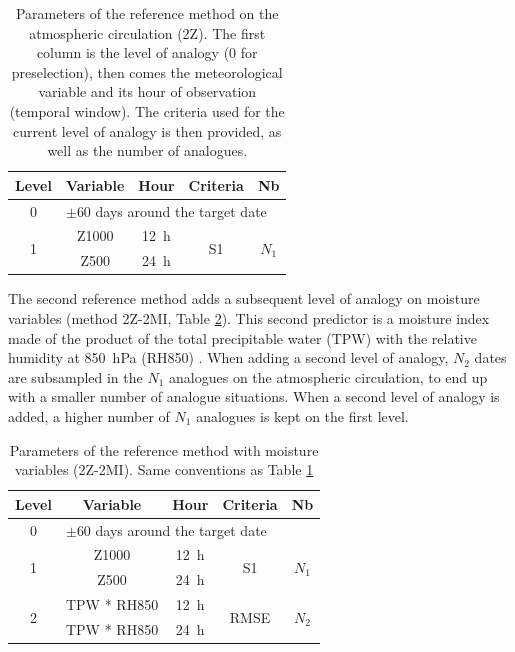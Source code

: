 \documentclass[hess]{copernicus}
\begin{document}
\begin{table}[htb]
	\caption{Parameters of the reference method on the atmospheric circulation (2Z). The first column is the level of analogy (0 for preselection), then comes the meteorological variable and its hour of observation (temporal window). The criteria used for the current level of analogy is then provided, as well as the number of analogues.}
	\footnotesize
	\begin{center}
		\begin{tabular}{ccccc}
			\hline
			Level & Variable & Hour & Criteria & Nb \\ 
			\hline 
			0 & \multicolumn{4}{l}{$\pm 60$ days around the target date} \\
			\hline 
			\multirow{2}{*}{1} & Z1000 & 12~h & \multirow{2}{*}{S1} & \multirow{2}{*}{$N_{1}$} \\
			& Z500 & 24~h & & \\ 
			\hline 
		\end{tabular} 
	\end{center}
	\label{table:method_2Z}
\end{table}

The second reference method adds a subsequent level of analogy on moisture variables (method 2Z-2MI, Table \ref{table:method_2Z-2MI}). This second predictor is a moisture index made of the product of the total precipitable water (TPW) with the relative humidity at 850~hPa (RH850) \citep{Bontron2004}. When adding a second level of analogy, $N_{2}$ dates are subsampled in the $N_{1}$ analogues on the atmospheric circulation, to end up with a smaller number of analogue situations. When a second level of analogy is added, a higher number of $N_{1}$ analogues is kept on the first level.

\begin{table}[htb]
	\caption{Parameters of the reference method with moisture variables (2Z-2MI). Same conventions as Table \ref{table:method_2Z}}
	\footnotesize
	\begin{center}
		\begin{tabular}{ccccc}
			\hline 
			Level & Variable & Hour & Criteria & Nb \\ 
			\hline 
			0 & \multicolumn{4}{l}{$\pm 60$ days around the target date} \\
			\hline 
			\multirow{2}{*}{1} & Z1000 & 12~h & \multirow{2}{*}{S1} & \multirow{2}{*}{$N_{1}$} \\
			& Z500 & 24~h & & \\ 
			\hline
			\multirow{2}{*}{2} & TPW * RH850 & 12~h & \multirow{2}{*}{RMSE} & \multirow{2}{*}{$N_{2}$} \\
			& TPW * RH850 & 24~h & & \\ 
			\hline 
		\end{tabular} 
	\end{center}
	\label{table:method_2Z-2MI}
\end{table}
\end{document}
